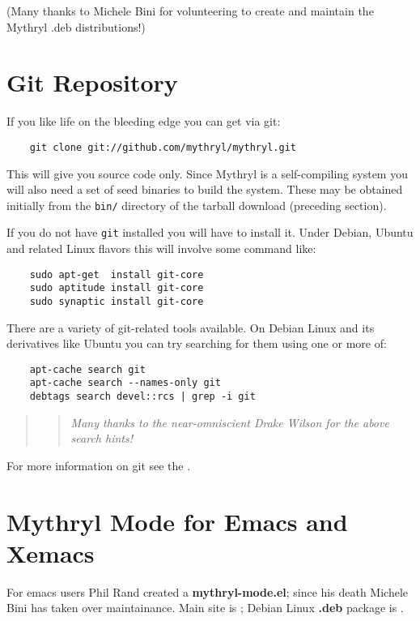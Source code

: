 (Many thanks to Michele Bini for volunteering to create and maintain the Mythryl .deb distributions!)

\section{Git Repository}

If you like life on the bleeding edge you can get  via git:

\begin{verbatim}
    git clone git://github.com/mythryl/mythryl.git
\end{verbatim}

This will give you source code only.  Since Mythryl is a self-compiling system you will also 
need a set of seed binaries to build the system.  These may be obtained initially from the 
{\tt bin/} directory of the tarball download (preceding section).

If you do not have {\tt git} installed you will have to install 
it.  Under Debian, Ubuntu and related Linux flavors this will 
involve some command like:

\begin{verbatim}
    sudo apt-get  install git-core
    sudo aptitude install git-core
    sudo synaptic install git-core
\end{verbatim}

There are a variety of git-related tools available.  On Debian Linux and its derivatives 
like Ubuntu you can try searching for them using one or more of:
\begin{verbatim}
    apt-cache search git
    apt-cache search --names-only git
    debtags search devel::rcs | grep -i git
\end{verbatim}

\begin{quotation}
\begin{quotation}
{\it \tiny Many thanks to the near-omniscient Drake Wilson for the above search hints!}
\end{quotation}
\end{quotation}


For more information on git see the .

\section{Mythryl Mode for Emacs and Xemacs}

For emacs users Phil Rand created a \textbf{mythryl-mode.el};  since his death Michele 
Bini has taken over maintainance.  Main site is ; Debian 
Linux \textbf{.deb} package is .

